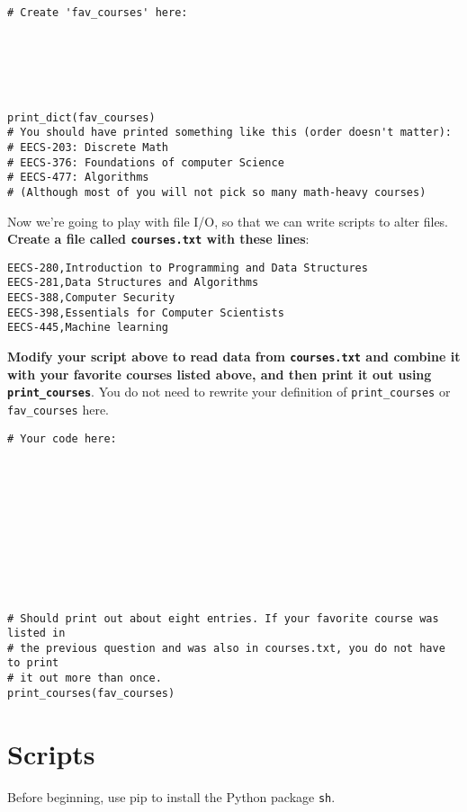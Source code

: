 \documentclass{article}
\begin{document}
\begin{enumerate}
\begin{minipage}{\textwidth}
\begin{lstlisting}[style=Python]
# Create 'fav_courses' here:






print_dict(fav_courses)
# You should have printed something like this (order doesn't matter):
# EECS-203: Discrete Math
# EECS-376: Foundations of computer Science
# EECS-477: Algorithms
# (Although most of you will not pick so many math-heavy courses)
  \end{lstlisting}
\end{minipage}

\begin{minipage}{\textwidth}
    \item Now we're going to play with file I/O, so that we can write scripts to alter files. \textbf{Create a file called \texttt{courses.txt} with these lines}:
    \begin{lstlisting}[style=Python]
EECS-280,Introduction to Programming and Data Structures
EECS-281,Data Structures and Algorithms
EECS-388,Computer Security
EECS-398,Essentials for Computer Scientists
EECS-445,Machine learning
    \end{lstlisting} 
    \textbf{Modify your script above to read data from \texttt{courses.txt} and combine it with your favorite courses listed above, and then print it out using \texttt{print\_courses}}. You do not need to rewrite your definition of \texttt{print\_courses} or \texttt{fav\_courses} here.
  \begin{lstlisting}[style=Python]
# Your code here:











# Should print out about eight entries. If your favorite course was listed in
# the previous question and was also in courses.txt, you do not have to print
# it out more than once.
print_courses(fav_courses)
  \end{lstlisting}
\end{minipage}
\end{enumerate}

\section{Scripts}
Before beginning, use pip to install the Python package \texttt{sh}.
\end{document}
